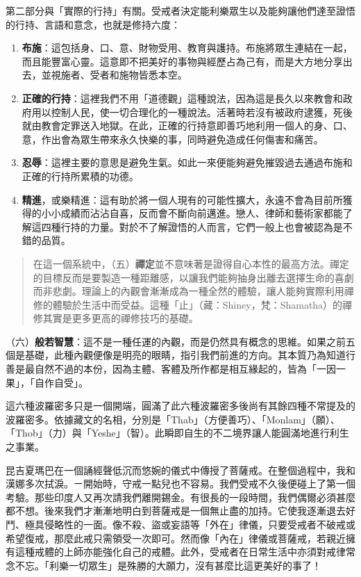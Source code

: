 第二部分與「實際的行持」有關。受戒者決定能利樂眾生以及能夠讓他們達至證悟的行持、言語和意念，也就是修持六度：

\begin{enumerate}
\item
  \textbf{布施}：這包括身、口、意、財物受用、教育與護持。布施將眾生連結在一起，而且能豐富心靈。這意即不把美好的事物與經歷占為己有，而是大方地分享出去，並視施者、受者和施物皆悉本空。
\item
  \textbf{正確的行持}：這裡我們不用「道德觀」這種說法，因為這是長久以來教會和政府用以控制人民，使一切合理化的一種說法。活著時若沒有被政府逮獲，死後就由教會定罪送入地獄。在此，正確的行持意即善巧地利用一個人的身、口、意，作出會為眾生帶來永久快樂的事，同時避免造成任何傷害和痛苦。
\item
  \textbf{忍辱}：這裡主要的意思是避免生氣。如此一來便能夠避免摧毀過去通過布施和正確的行持所累積的功德。
\item
  \textbf{精進}，或樂精進：這有助於將一個人現有的可能性擴大，永遠不會為目前所獲得的小小成績而沾沾自喜，反而會不斷向前邁進。戀人、律師和藝術家都能了解這四種行持的力量。對於不了解證悟的人而言，它們一般上也會被認為是不錯的品質。
\end{enumerate}

\begin{quote}
在這一個系統中，（五）\textbf{禪定}並不意味著是證得自心本性的最高方法。禪定的目標反而是要製造一種距離感，以讓我們能夠抽身出離去選擇生命的喜劇而非悲劇。理論上的內觀會漸漸成為一種全然的體驗，讓人能夠實際利用禪修的體驗於生活中而受益。這種「止」（藏：Shiney，梵：Shamatha）的禪修其實是更多更高的禪修技巧的基礎。
\end{quote}

（六）\textbf{般若智慧}：這不是一種任運的內觀，而是仍然具有概念的思維。如果之前五個是基礎，此種內觀便像是明亮的眼睛，指引我們前進的方向。其本質乃為知道行善是最自然不過的本份，因為主體、客體及所作都是相互緣起的，皆為「一因一果」，「自作自受」。

這六種波羅密多只是一個開端，圓滿了此六種波羅密多後尚有其餘四種不常提及的波羅密多。依據藏文的名相，分別是「Thab」（方便善巧）、「Monlam」（願）、「Thob」（力）與「Yeshe」（智）。此瞬即自生的不二境界讓人能圓滿地進行利生之事業。

昆吉夏瑪巴在一個誦經聲低沉而悠婉的儀式中傳授了菩薩戒。在整個過程中，我和漢娜多次拭淚。ㄧ開始時，守戒一點兒也不容易。我們受戒不久後便碰上了第一個考驗。那些印度人又再次請我們離開錫金。有很長的一段時間，我們偶爾必須甚麼都不想。後來我們才漸漸地明白到菩薩戒是一個無止盡的加持。它使我逐漸退去好鬥、極具侵略性的一面。像不殺、盜或妄語等「外在」律儀，只要受戒者不破戒或希望復戒，那麼此戒只需領受一次即可。然而像「內在」律儀或菩薩戒，若親近擁有這種戒體的上師亦能強化自己的戒體。此外，受戒者在日常生活中亦須對戒律常念不忘。「利樂一切眾生」是殊勝的大願力，沒有甚麼比這更美好的事了！

